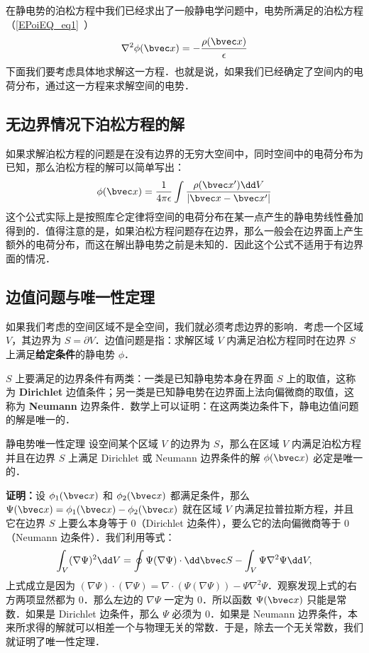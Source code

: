

在静电势的泊松方程中我们已经求出了一般静电学问题中，电势所满足的泊松方程（\autoref{EPoiEQ_eq1}~）
\begin{align}
\nabla^2 \phi(\bvec x)=-\frac{\rho(\bvec x)}{\epsilon}
\end{align}
下面我们要考虑具体地求解这一方程．也就是说，如果我们已经确定了空间内的电荷分布，通过这一方程来求解空间的电势．
\subsection{无边界情况下泊松方程的解}
如果求解泊松方程的问题是在没有边界的无穷大空间中，同时空间中的电荷分布为已知，那么泊松方程的解可以简单写出：
\begin{align}
\phi(\bvec x)=\frac{1}{4\pi \epsilon}\int \frac{\rho (\bvec x')\dd V}{|\bvec x-\bvec x'|}
\end{align}
这个公式实际上是按照库仑定律将空间的电荷分布在某一点产生的静电势线性叠加得到的．值得注意的是，如果泊松方程问题存在边界，那么一般会在边界面上产生额外的电荷分布，而这在解出静电势之前是未知的．因此这个公式不适用于有边界面的情况．
\subsection{边值问题与唯一性定理}
如果我们考虑的空间区域不是全空间，我们就必须考虑边界的影响．考虑一个区域 $V$，其边界为 $S=\partial V$．边值问题是指：求解区域 $V$ 内满足泊松方程同时在边界 $S$ 上满足\textbf{给定条件}的静电势 $\phi$．

$S$ 上要满足的边界条件有两类：一类是已知静电势本身在界面 $S$
上的取值，这称为 \textbf{Dirichlet} 边值条件；另一类是已知静电势在边界面上法向偏微商的取值，这称为 \textbf{Neumann} 边界条件．数学上可以证明：在这两类边条件下，静电边值问题的解是唯一的．
\begin{theorem}{静电势唯一性定理}\label{empoi_the1}
设空间某个区域 $V$ 的边界为 $S$，那么在区域 $V$ 内满足泊松方程并且在边界 $S$ 上满足 Dirichlet 或 Neumann 边界条件的解 $\phi(\bvec x)$ 必定是唯一的．
\end{theorem}
\textbf{证明：}设 $\phi_1(\bvec x)$ 和 $\phi_2(\bvec x)$ 都满足条件，那么 $\Psi(\bvec x)=\phi_1(\bvec x)-\phi_2(\bvec x)$ 就在区域 $V$ 内满足拉普拉斯方程，并且它在边界 $S$ 上要么本身等于 $0$（Dirichlet 边条件），要么它的法向偏微商等于 $0$（Neumann 边条件）．我们利用等式：
\begin{align}
\int_V (\nabla \Psi)^2 \dd V=\oint \Psi(\nabla \Psi)\cdot \dd \bvec S - \int_V \Psi \nabla^2\Psi \dd V,
\end{align}
上式成立是因为 $(\nabla \Psi)\cdot (\nabla \Psi)=\nabla\cdot (\Psi(\nabla\Psi))-\Psi\nabla^2\Psi$．观察发现上式的右方两项显然都为 $0$．那么左边的 $\nabla\Psi$ 一定为 $0$．所以函数 $\Psi(\bvec x)$ 只能是常数．如果是 Dirichlet 边条件，那么 $\Psi$ 必须为 $0$．如果是 Neumann 边界条件，本来所求得的解就可以相差一个与物理无关的常数．于是，除去一个无关常数，我们就证明了唯一性定理．

